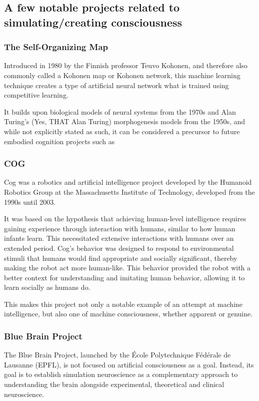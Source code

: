 \documentclass[masterthesis]{fer}
\begin{document}
\subsection{A few notable projects related to simulating/creating consciousness}
\subsubsection{The Self-Organizing Map}

Introduced in 1980 by the Finnish professor Teuvo Kohonen, and therefore also commonly called a Kohonen map or Kohonen network, this machine learning technique creates a type of artificial neural network what is trained using competitive learning.

It builds upon biological models of neural systems from the 1970s and Alan Turing's (Yes, THAT Alan Turing) morphogenesis models from the 1950s, and while not explicitly stated as such, it can be considered a precursor to future embodied cognition projects such as
\subsubsection{COG}
Cog was a robotics and artificial intelligence project developed by the Humanoid Robotics Group at the Massachusetts Institute of Technology, developed from the 1990s until 2003.

It was based on the hypothesis that achieving human-level intelligence requires gaining experience through interaction with humans, similar to how human infants learn. This necessitated extensive interactions with humans over an extended period.
Cog's behavior was designed to respond to environmental stimuli that humans would find appropriate and socially significant, thereby making the robot act more human-like. This behavior provided the robot with a better context for understanding and imitating human behavior, allowing it to learn socially as humans do.

This makes this project not only a notable example of an attempt at machine intelligence, but also one of machine consciousness, whether apparent or genuine.

\subsubsection{Blue Brain Project}
The Blue Brain Project, launched by the École Polytechnique Fédérale de Lausanne (EPFL), is not focused on artificial consciousness as a goal. Instead, its goal is to establish simulation neuroscience as a complementary approach to understanding the brain alongside experimental, theoretical and clinical neuroscience.
\end{document}

